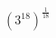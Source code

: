 \documentclass[preview]{standalone}
\begin{document}
\begin{align*}
\left(3^{18} \right)^\frac{1}{18}\\
\end{align*}
\end{document}
